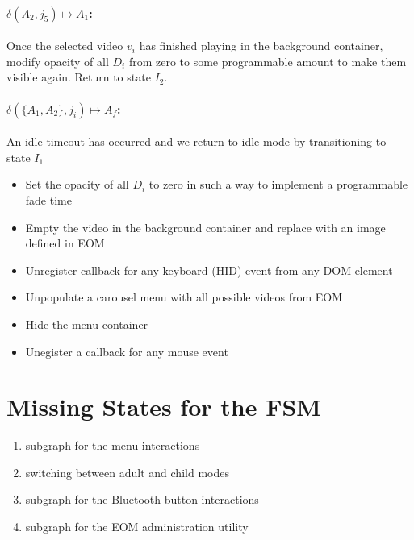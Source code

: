 \documentclass[10pt]{article}
\begin{document}
\paragraph{$\delta(A_{2}, j_{5}) \mapsto A_{1}$:}

Once the selected video $v_{i}$ has finished playing in the background container, modify opacity of all $D_{i}$ from zero to some programmable amount to make them visible again. Return to state $I_{2}$.

\paragraph{$\delta(\{A_{1}, A_{2}\}, j_{i}) \mapsto A_{f}$:} 

An idle timeout has occurred and we return to idle mode by transitioning to state $I_{1}$

\begin{itemize}
	\item Set the opacity of all $D_{i}$ to zero in such a way to implement a programmable fade time
	\item Empty the video in the background container and replace with an image defined in EOM
	\item Unregister callback for any keyboard (HID) event from any DOM element
	\item Unpopulate a carousel menu with all possible videos from EOM
	\item Hide the menu container
	\item Unegister a callback for any mouse event 
\end{itemize}

\section{Missing States for the FSM}

\begin{enumerate}

	\item subgraph for the menu interactions
	\item switching between adult and child modes
	\item subgraph for the Bluetooth button interactions
	\item subgraph for the EOM administration utility

\end{enumerate}
\end{document}
